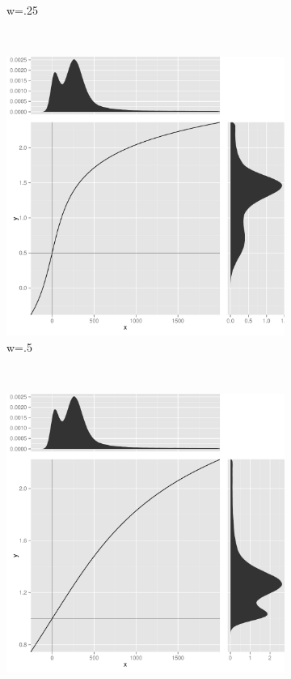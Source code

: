 \begin{figure}[h]
\begin{subfigure}[b]{.4\textwidth}
    \caption{w=.25}
\end{subfigure}
~
\begin{subfigure}[b]{.4\textwidth}
    \centering
    \includegraphics[scale=.3]{figures/logicle-transform-c.pdf}
    \caption{w=.5}
\end{subfigure}
~
\begin{subfigure}[b]{.4\textwidth}
    \centering
    \includegraphics[scale=.3]{figures/logicle-transform-d.pdf}

\end{subfigure}
\end{figure}
